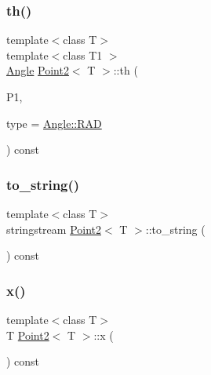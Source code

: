 \subsubsection{\texorpdfstring{th()}{th()}}
{\footnotesize\ttfamily template$<$class T$>$ \\
template$<$class T1 $>$ \\
\mbox{\hyperlink{class_angle}{Angle}} \mbox{\hyperlink{class_point2}{Point2}}$<$ T $>$\+::th (\begin{DoxyParamCaption}\item[{\mbox{\hyperlink{class_point2}{Point2}}$<$ T1 $>$}]{P1,  }\item[{\mbox{\hyperlink{class_angle_a4f7b9849ce8780bcba95ca3ee45cff77}{Angle\+::\+A\+N\+G\+L\+E\+\_\+\+T\+Y\+PE}}}]{type = {\ttfamily \mbox{\hyperlink{class_angle_a4f7b9849ce8780bcba95ca3ee45cff77a93ab6b68075fd7a6fe724fbde5b13c1f}{Angle\+::\+R\+AD}}} }\end{DoxyParamCaption}) const\hspace{0.3cm}{\ttfamily [inline]}}

\mbox{\label{class_point2_aa04082290a2f554060081beafd7d7e0d}} 
\subsubsection{\texorpdfstring{to\_string()}{to\_string()}}
{\footnotesize\ttfamily template$<$class T$>$ \\
stringstream \mbox{\hyperlink{class_point2}{Point2}}$<$ T $>$\+::to\+\_\+string (\begin{DoxyParamCaption}{ }\end{DoxyParamCaption}) const\hspace{0.3cm}{\ttfamily [inline]}}

\mbox{\label{class_point2_adbf149d6f50de0d91c714a3fc45a80c5}} 
\subsubsection{\texorpdfstring{x()}{x()}\hspace{0.1cm}{\footnotesize\ttfamily [1/2]}}
{\footnotesize\ttfamily template$<$class T$>$ \\
T \mbox{\hyperlink{class_point2}{Point2}}$<$ T $>$\+::x (\begin{DoxyParamCaption}{ }\end{DoxyParamCaption}) const\hspace{0.3cm}{\ttfamily [inline]}}

